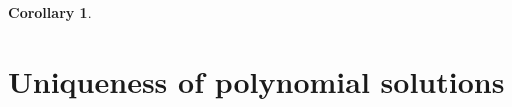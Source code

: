 \documentclass[final,nopreprintline]{elsarticle}
\newtheorem{corollary}[theorem]{Corollary}
\theoremstyle{definition}
\numberwithin{equation}{section}
\theoremstyle{remark}
\newtheorem{remark}[theorem]{Remark}
\begin{document}
\begin{corollary}
\begin{enumerate}[\rm(i)]
\end{enumerate}
\end{corollary}



\section{Uniqueness of polynomial solutions}\label{sec:uniqueness}
\end{document}
